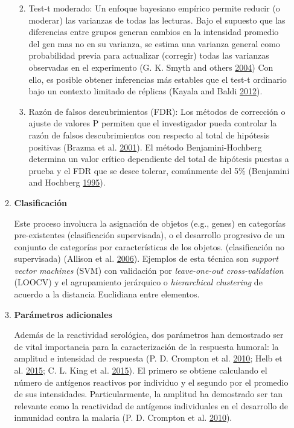 \documentclass[a4paper]{article}
\providecommand{\tightlist}{%
  \setlength{\itemsep}{0pt}\setlength{\parskip}{0pt}}
\begin{document}
\begin{enumerate}
\begin{enumerate}
    \begin{enumerate}
    \def\labelenumiii{\arabic{enumiii}.}
    \tightlist
    \item
      Test-t moderado: Un enfoque bayesiano empírico permite reducir (o
      moderar) las varianzas de todas las lecturas. Bajo el supuesto que
      las diferencias entre grupos generan cambios en la intensidad
      promedio del gen mas no en su varianza, se estima una varianza
      general como probabilidad previa para actualizar (corregir) todas
      las varianzas observadas en el experimento (G. K. Smyth and others
      \protect\hyperlink{ref-smyth2004ebayes}{2004}) Con ello, es
      posible obtener inferencias más estables que el test-t ordinario
      bajo un contexto limitado de réplicas (Kayala and Baldi
      \protect\hyperlink{ref-kayala2012cyber}{2012}).
    \item
      Razón de falsos descubrimientos (FDR): Los métodos de corrección o
      ajuste de valores P permiten que el investigador pueda controlar
      la razón de falsos descubrimientos con respecto al total de
      hipótesis positivas (Brazma et al.
      \protect\hyperlink{ref-brazma2001}{2001}). El método
      Benjamini-Hochberg determina un valor crítico dependiente del
      total de hipótesis puestas a prueba y el FDR que se desee tolerar,
      comúnmente del 5\% (Benjamini and Hochberg
      \protect\hyperlink{ref-benjamini1995fdr}{1995}). 
    \end{enumerate}
  \item
    \textbf{Clasificación}

    Este proceso involucra la asignación de objetos (e.g., genes) en
    categorías pre-existentes (clasificación supervisada), o el
    desarrollo progresivo de un conjunto de categorías por
    características de los objetos. (clasificación no supervisada)
    (Allison et al. \protect\hyperlink{ref-allison2006}{2006}). Ejemplos
    de esta técnica son \emph{support vector machines} (SVM) con
    validación por \emph{leave-one-out cross-validation} (LOOCV) y el
    agrupamiento jerárquico o \emph{hierarchical clustering} de acuerdo
    a la distancia Euclidiana entre elementos.
  \item
    \textbf{Parámetros adicionales}

    Además de la reactividad serológica, dos parámetros han demostrado
    ser de vital importancia para la caracterización de la respuesta
    humoral: la amplitud e intensidad de respuesta (P. D. Crompton et
    al. \protect\hyperlink{ref-crompton2010}{2010}; Helb et al.
    \protect\hyperlink{ref-Helb2015exposure}{2015}; C. L. King et al.
    \protect\hyperlink{ref-King2015FOC}{2015}). El primero se obtiene
    calculando el número de antígenos reactivos por individuo y el
    segundo por el promedio de sus intensidades. Particularmente, la
    amplitud ha demostrado ser tan relevante como la reactividad de
    antígenos individuales en el desarrollo de inmunidad contra la
    malaria (P. D. Crompton et al.
    \protect\hyperlink{ref-crompton2010}{2010}). 
  \end{enumerate}
\end{enumerate}
\end{document}
